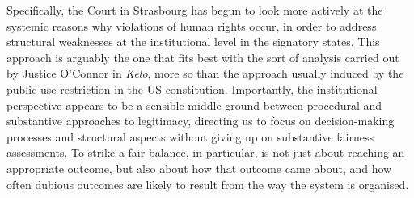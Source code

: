

Specifically, the Court in Strasbourg has begun to look more actively at the systemic reasons why violations of human rights occur, in order to address structural weaknesses at the institutional level in the signatory states. This approach is arguably the one that fits best with the sort of analysis carried out by Justice O'Connor in {\it Kelo}, more so than the approach usually induced by the public use restriction in the US constitution. Importantly, the institutional perspective appears to be a sensible middle ground between procedural and substantive approaches to legitimacy, directing us to focus on decision-making processes and structural aspects without giving up on substantive fairness assessments. To strike a fair balance, in particular, is not just about reaching an appropriate outcome, but also about how that outcome came about, and how often dubious outcomes are likely to result from the way the system is organised.


